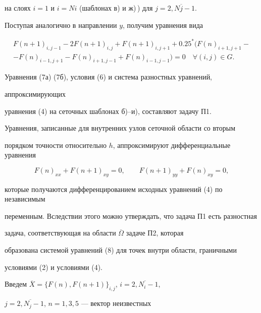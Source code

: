 на слоях $i=1$ и $i=Ni$ (шаблонах в) и ж)\,) для $j=\overline{2,Nj-1}$. 


 


Поступая аналогично в направлении $y$, получим уравнения вида 


\begin{multline} 


F(n+1)_{i,j-1}-2F(n+1)_{i,j}+F(n+1)_{i,j+1}+0.25^*(F(n)_{i+1,j+1} -\\


-F(n)_{i-1,j+1}-F(n)_{i+1,j-1}+F(n)_{i-1,j-1})=0\quad \forall (i,j)\in G. 


\tag{7б}


\end{multline} 


 


Уравнения (7а) (7б), условия (6) и система разностных уравнений,


аппроксимирующих 


уравнения (4) на сеточных шаблонах б)--и), составляют задачу П1. 


 


Уравнения, записанные для внутренних узлов сеточной области со вторым 


порядком точности относительно $h$, аппроксимируют дифференциальные уравнения 


\begin{equation} 


F(n)_{xx}+F(n+1)_{xy}=0,\qquad F(n+1)_{yy}+F(n)_{xy}=0, \tag{8}


\end{equation} 


которые получаются дифференцированием исходных уравнений (4) по независимым 


переменным. Вследствии этого можно утверждать, что задача П1 есть разностная 


задача, соответствующая на области $\overline\Omega$ задаче П2, которая 


образована системой уравнений (8) для точек внутри области, граничными 


условиями (2) и условиями (4). 


 


Введем $\overline X=\{F(n),F(n+1)\}_{i,j}$, $i=\overline{2,N_i-1}$, 


$j=\overline{2,N_j-1}$, $n=1,3,5$ --- вектор неизвестных 


